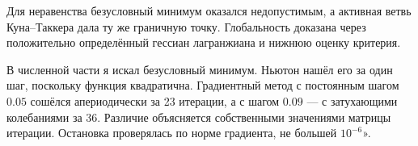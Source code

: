\documentclass[12pt,a4paper]{article}
\begin{document}
Для неравенства безусловный минимум оказался недопустимым,
а активная ветвь Куна--Таккера дала ту же граничную точку.
Глобальность доказана через положительно определённый гессиан
лагранжиана и нижнюю оценку критерия.

В численной части я искал безусловный минимум.
Ньютон нашёл его за один шаг, поскольку функция квадратична.
Градиентный метод с постоянным шагом $0.05$ сошёлся апериодически
за 23 итерации, а с шагом $0.09$ --- с затухающими колебаниями
за 36. Различие объясняется собственными значениями матрицы итерации.
Остановка проверялась по норме градиента, не большей $10^{-6}$».
\end{document}
